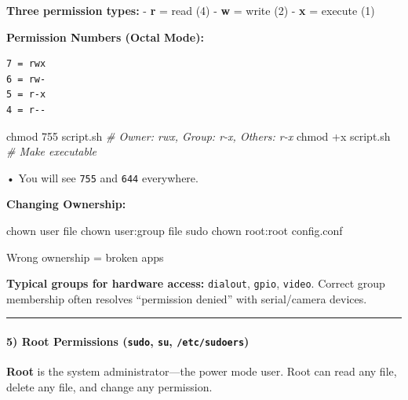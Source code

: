 \documentclass[
  english,
  paper=a4,
  oneside  ,captions=tableheading
]{scrartcl}
\newenvironment{Shaded}{}{}
\newcommand{\CommentTok}[1]{\textcolor[rgb]{0.38,0.63,0.69}{\textit{#1}}}
\newcommand{\FunctionTok}[1]{\textcolor[rgb]{0.02,0.16,0.49}{#1}}
\newcommand{\NormalTok}[1]{#1}
\renewenvironment{quote}{\begin{customblockquote}\list{}{\rightmargin=0em\leftmargin=0em}%
\item\relax\color{blockquote-text}\ignorespaces}{\unskip\unskip\endlist\end{customblockquote}}
\begin{document}
\textbf{Three permission types:} - \textbf{r} = read (4) - \textbf{w} =
write (2) - \textbf{x} = execute (1)

\textbf{Permission Numbers (Octal Mode):}

\begin{verbatim}
7 = rwx
6 = rw-
5 = r-x
4 = r--
\end{verbatim}

\begin{Shaded}
\begin{Highlighting}[]
\FunctionTok{chmod}\NormalTok{ 755 script.sh    }\CommentTok{\# Owner: rwx, Group: r{-}x, Others: r{-}x}
\FunctionTok{chmod}\NormalTok{ +x script.sh     }\CommentTok{\# Make executable}
\end{Highlighting}
\end{Shaded}

\begin{quote}
• You will see \texttt{755} and \texttt{644} everywhere.
\end{quote}

\textbf{Changing Ownership:}

\begin{Shaded}
\begin{Highlighting}[]
\FunctionTok{chown}\NormalTok{ user file}
\FunctionTok{chown}\NormalTok{ user:group file}
\FunctionTok{sudo}\NormalTok{ chown root:root config.conf}
\end{Highlighting}
\end{Shaded}

\faExclamationCircle Wrong ownership = broken apps

\textbf{Typical groups for hardware access:} \texttt{dialout},
\texttt{gpio}, \texttt{video}. Correct group membership often resolves
``permission denied'' with serial/camera devices.

\begin{center}\rule{0.5\linewidth}{0.5pt}\end{center}

\paragraph{\texorpdfstring{5) Root Permissions (\texttt{sudo},
\texttt{su},
\texttt{/etc/sudoers})}{5) Root Permissions (sudo, su, /etc/sudoers)}}\label{root-permissions-sudo-su-etcsudoers}

\textbf{Root} is the system administrator---the power mode user. Root
can read any file, delete any file, and change any permission.
\end{document}
